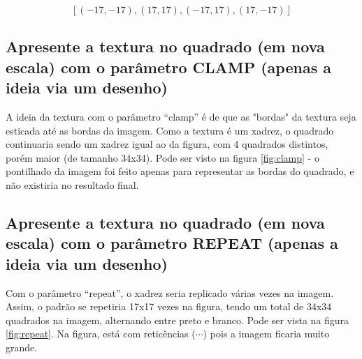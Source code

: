 \documentclass{article}
\begin{document}
$$[(-17, -17), (17, 17), (-17, 17), (17, -17)]$$

\subsection{Apresente a textura no quadrado (em nova escala) com o parâmetro CLAMP (apenas a ideia via um desenho)}

A ideia da textura com o parâmetro ``clamp'' é de que as "bordas" da textura seja esticada até as bordas da imagem. Como a textura é um xadrez, o quadrado continuaria sendo um xadrez igual ao da figura, com 4 quadrados distintos, porém maior (de tamanho 34x34). Pode ser visto na figura \ref{fig:clamp} - o pontilhado da imagem foi feito apenas para representar as bordas do quadrado, e não existiria no resultado final.


\subsection{Apresente a textura no quadrado (em nova escala) com o parâmetro REPEAT (apenas a ideia via um desenho)}

Com o parâmetro ``repeat'', o xadrez seria replicado várias vezes na imagem. Assim, o padrão se repetiria 17x17 vezes na figura, tendo um total de 34x34 quadrados na imagem, alternando entre preto e branco. Pode ser vista na figura \ref{fig:repeat}. Na figura, está com reticências ($\cdots$) pois a imagem ficaria muito grande.
\end{document}
